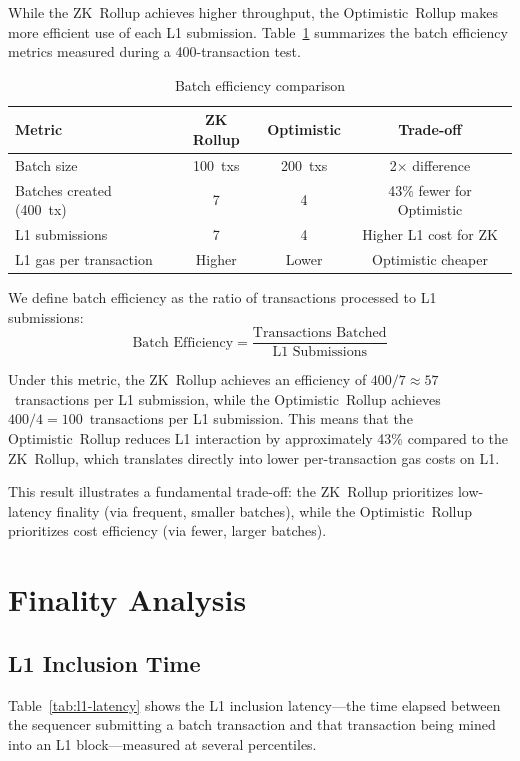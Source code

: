 While the ZK~Rollup achieves higher throughput, the Optimistic~Rollup makes more efficient use of each L1 submission. Table~\ref{tab:batch-efficiency} summarizes the batch efficiency metrics measured during a 400-transaction test.

\begin{table}[h]
    \centering
    \begin{tabular}{l|c|c|c}
        \hline
        \textbf{Metric} & \textbf{ZK Rollup} & \textbf{Optimistic} & \textbf{Trade-off} \\
        \hline
        Batch size & 100~txs & 200~txs & 2$\times$ difference \\
        \hline
        Batches created (400~tx) & 7 & 4 & 43\% fewer for Optimistic \\
        \hline
        L1 submissions & 7 & 4 & Higher L1 cost for ZK \\
        \hline
        L1 gas per transaction & Higher & Lower & Optimistic cheaper \\
        \hline
    \end{tabular}
    \caption{Batch efficiency comparison}
    \label{tab:batch-efficiency}
\end{table}

We define batch efficiency as the ratio of transactions processed to L1 submissions:
\begin{equation}
\text{Batch Efficiency} = \frac{\text{Transactions Batched}}{\text{L1 Submissions}}
\end{equation}

Under this metric, the ZK~Rollup achieves an efficiency of $400 / 7 \approx 57$~transactions per L1 submission, while the Optimistic~Rollup achieves $400 / 4 = 100$~transactions per L1 submission. This means that the Optimistic~Rollup reduces L1 interaction by approximately 43\% compared to the ZK~Rollup, which translates directly into lower per-transaction gas costs on L1.

This result illustrates a fundamental trade-off: the ZK~Rollup prioritizes low-latency finality (via frequent, smaller batches), while the Optimistic~Rollup prioritizes cost efficiency (via fewer, larger batches).

\section{Finality Analysis}

\subsection{L1 Inclusion Time}
Table~\ref{tab:l1-latency} shows the L1 inclusion latency---the time elapsed between the sequencer submitting a batch transaction and that transaction being mined into an L1 block---measured at several percentiles.

